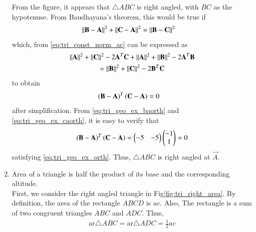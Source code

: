\begin{enumerate}[label=\arabic*.,ref=\thesubsection.\theenumi]
\begin{figure}[!ht]
\caption{}
\label{fig:check_tri}
\end{figure}
%
From the figure, it appears that $\triangle ABC$ is right angled, with $BC$ as the hypotenuse.  From Baudhayana's theorem, this would be true if 
\begin{align}
\left\lVert\mathbf{B}-\mathbf{A}\right\rVert^2+\left\lVert\mathbf{C}-\mathbf{A}\right\rVert^2&=\left\lVert\mathbf{B}-\mathbf{C}\right\rVert^2
\end{align}
which, from \eqref{eq:tri_const_norm_ac} can be expressed as
\begin{multline}
\left\lVert\mathbf{A}\right\rVert^2 + \left\lVert\mathbf{C}\right\rVert^2 - 2\mathbf{A}^T\mathbf{C}+
\left\lVert\mathbf{A}\right\rVert^2 + \left\lVert\mathbf{B}\right\rVert^2 - 2\mathbf{A}^T\mathbf{B}
\\
=
\left\lVert\mathbf{B}\right\rVert^2 + \left\lVert\mathbf{C}\right\rVert^2 - 2\mathbf{B}^T\mathbf{C}
\end{multline}
%
to obtain 
\begin{align}
\label{eq:tri_geo_ex_orth}
\left(\mathbf{B}-\mathbf{A}\right)^T\left(\mathbf{C}-\mathbf{A}\right)&=0
\end{align}
%
after simplification.  From \eqref{eq:tri_geo_ex_baorth} and \eqref{eq:tri_geo_ex_caorth}, it is easy to verify that 
\begin{align}
\label{eq:tri_geo_ex_orth_sol}
\left(\mathbf{B}-\mathbf{A}\right)^T\left(\mathbf{C}-\mathbf{A}\right)=
 \begin{pmatrix}-5 & -5\end{pmatrix}\begin{pmatrix}-1\\1\end{pmatrix} = 0
\end{align}
satisfying
\eqref{eq:tri_geo_ex_orth}. Thus,  $\triangle ABC$ is right angled at $\vec{A}$.
%
%
\item Area of a triangle is half the product of its base and the corresponding altitude. 
%
\\
\solution First, we consider the right angled triangle in Fig\ref{fig:tri_right_area}. By definition, the area of the rectangle $ABCD$ is $ac$.  Also, The rectangle is a sum of two congruent triangles $ABC$ and $ADC$.  Thus,
%
\begin{align}
\text{ar}\triangle ABC=\text{ar}\triangle ADC = \frac{1}{2}ac
\end{align} 
%
\begin{figure}[!ht]

\end{figure}
\end{enumerate}
